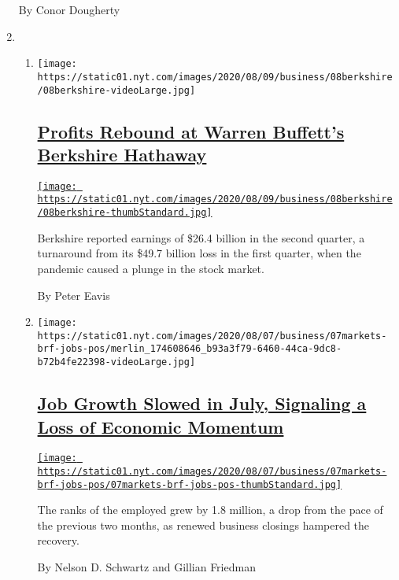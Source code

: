 \begin{enumerate}
  By Conor Dougherty
\item
  \begin{enumerate}
  \def\labelenumii{\arabic{enumii}.}
  \item
    \texttt{[image: https://static01.nyt.com/images/2020/08/09/business/08berkshire/08berkshire-videoLarge.jpg]}

    \hypertarget{profits-rebound-at-warren-buffetts-berkshire-hathaway}{%
    \subsection{\texorpdfstring{\href{/2020/08/08/business/berkshire-hathaway-earnings-warren-buffett.html}{Profits
    Rebound at Warren Buffett's Berkshire
    Hathaway}}{Profits Rebound at Warren Buffett's Berkshire Hathaway}}\label{profits-rebound-at-warren-buffetts-berkshire-hathaway}}

    \href{/2020/08/08/business/berkshire-hathaway-earnings-warren-buffett.html}{\texttt{[image: https://static01.nyt.com/images/2020/08/09/business/08berkshire/08berkshire-thumbStandard.jpg]}}

    Berkshire reported earnings of \$26.4 billion in the second quarter,
    a turnaround from its \$49.7 billion loss in the first quarter, when
    the pandemic caused a plunge in the stock market.

    By Peter Eavis
  \item
    \texttt{[image: https://static01.nyt.com/images/2020/08/07/business/07markets-brf-jobs-pos/merlin\_174608646\_b93a3f79-6460-44ca-9dc8-b72b4fe22398-videoLarge.jpg]}

    \hypertarget{job-growth-slowed-in-july-signaling-a-loss-of-economic-momentum}{%
    \subsection{\texorpdfstring{\href{/2020/08/07/business/economy/july-jobs-report.html}{Job
    Growth Slowed in July, Signaling a Loss of Economic
    Momentum}}{Job Growth Slowed in July, Signaling a Loss of Economic Momentum}}\label{job-growth-slowed-in-july-signaling-a-loss-of-economic-momentum}}

    \href{/2020/08/07/business/economy/july-jobs-report.html}{\texttt{[image: https://static01.nyt.com/images/2020/08/07/business/07markets-brf-jobs-pos/07markets-brf-jobs-pos-thumbStandard.jpg]}}

    The ranks of the employed grew by 1.8 million, a drop from the pace
    of the previous two months, as renewed business closings hampered
    the recovery.

    By Nelson D. Schwartz and Gillian Friedman
  \end{enumerate}
\end{enumerate}

